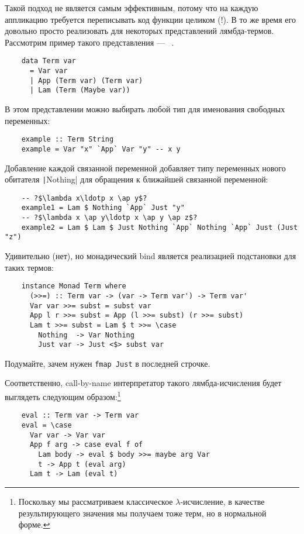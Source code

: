 Такой подход не является самым эффективным, потому что на каждую аппликацию требуется переписывать код функции целиком (!).
В то же время его довольно просто реализовать для некоторых представлений лямбда-термов.
Рассмотрим пример такого представления --- ~\cite{chargueraud2012locally}.

\begin{verbatim}
    data Term var
      = Var var
      | App (Term var) (Term var)
      | Lam (Term (Maybe var))
\end{verbatim}

В этом представлении можно выбирать любой тип для именования свободных переменных:
\begin{verbatim}
    example :: Term String
    example = Var "x" `App` Var "y" -- x y
\end{verbatim}
Добавление каждой связанной переменной добавляет типу переменных нового обитателя \texttt|Nothing| для обращения к ближайшей связанной переменной:
\begin{verbatim}
    -- ?$\lambda x\ldotp x \ap y$?
    example1 = Lam $ Nothing `App` Just "y"
    -- ?$\lambda x \ap y\ldotp x \ap y \ap z$?
    example2 = Lam $ Lam $ Just Nothing `App` Nothing `App` Just (Just "z")
\end{verbatim}

Удивительно (нет), но монадический bind является реализацией подстановки для таких термов:

\begin{verbatim}
    instance Monad Term where
      (>>=) :: Term var -> (var -> Term var') -> Term var'
      Var var >>= subst = subst var
      App l r >>= subst = App (l >>= subst) (r >>= subst)
      Lam t >>= subst = Lam $ t >>= \case
        Nothing  -> Var Nothing
        Just var -> Just <$> subst var
\end{verbatim}

\begin{task}
    Подумайте, зачем нужен \texttt{fmap Just} в последней строчке.
\end{task}

Соответственно, call-by-name интерпретатор такого лямбда-исчисления будет выглядеть следующим образом:\footnote{Поскольку мы рассматриваем классическое $\lambda$-исчисление, в качестве результирующего значения мы получаем тоже терм, но в нормальной форме.}

\begin{verbatim}
    eval :: Term var -> Term var
    eval = \case
      Var var -> Var var
      App f arg -> case eval f of
        Lam body -> eval $ body >>= maybe arg Var
        t -> App t (eval arg)
      Lam t -> Lam (eval t)
\end{verbatim}

